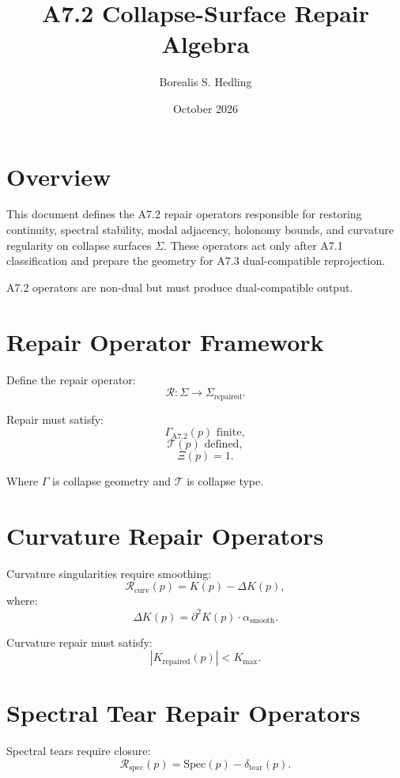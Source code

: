 \documentclass[11pt]{article}
\title{A7.2 Collapse-Surface Repair Algebra}
\author{Borealis S. Hedling}
\date{October 2026}
\begin{document}
\maketitle

\section*{Overview}

This document defines the A7.2 repair operators responsible for restoring
continuity, spectral stability, modal adjacency, holonomy bounds, and
curvature regularity on collapse surfaces $\Sigma$. These operators act
only after A7.1 classification and prepare the geometry for A7.3
dual-compatible reprojection.

A7.2 operators are non-dual but must produce dual-compatible output.

\section{Repair Operator Framework}

Define the repair operator:
\[
\mathcal{R} : \Sigma \to \Sigma_{\mathrm{repaired}}.
\]

Repair must satisfy:
\[
\Gamma_{\mathrm{A7.2}}(p) \text{ finite},
\]
\[
\mathcal{T}(p) \text{ defined},
\]
\[
\Xi(p) = 1.
\]

Where $\Gamma$ is collapse geometry and $\mathcal{T}$ is collapse type.

\section{Curvature Repair Operators}

Curvature singularities require smoothing:
\[
\mathcal{R}_{\mathrm{curv}}(p)
  = K(p) - \Delta K(p),
\]
where:
\[
\Delta K(p) = \partial^2 K(p) \cdot \alpha_{\mathrm{smooth}}.
\]

Curvature repair must satisfy:
\[
|K_{\mathrm{repaired}}(p)| < K_{\max}.
\]

\section{Spectral Tear Repair Operators}

Spectral tears require closure:
\[
\mathcal{R}_{\mathrm{spec}}(p)
  = \mathrm{Spec}(p) - \delta_{\mathrm{tear}}(p).
\]
\end{document}
